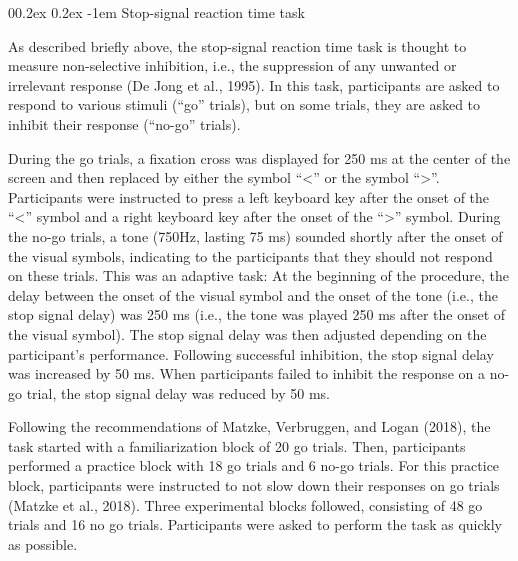 \documentclass[
  man,floatsintext]{apa6}
\makeatletter
\let\oldparagraph\paragraph
\renewcommand{\paragraph}[1]{\oldparagraph{#1}\mbox{}}
\renewcommand{\paragraph}{\@startsection{paragraph}{4}{\parindent}%
  {0\baselineskip \@plus 0.2ex \@minus 0.2ex}%
  {-1em}%
  {\normalfont\normalsize\bfseries\itshape\typesectitle}}
\makeatother
\begin{document}
\hypertarget{stop-signal-reaction-time-task}{%
\paragraph{Stop-signal reaction time task}\label{stop-signal-reaction-time-task}}

As described briefly above, the stop-signal reaction time task is thought to measure non-selective inhibition, i.e., the suppression of any unwanted or irrelevant response (De Jong et al., 1995). In this task, participants are asked to respond to various stimuli (``go'' trials), but on some trials, they are asked to inhibit their response (``no-go'' trials).

During the go trials, a fixation cross was displayed for 250 ms at the center of the screen and then replaced by either the symbol ``\textless{}'' or the symbol ``\textgreater{}''. Participants were instructed to press a left keyboard key after the onset of the ``\textless{}'' symbol and a right keyboard key after the onset of the ``\textgreater{}'' symbol. During the no-go trials, a tone (750Hz, lasting 75 ms) sounded shortly after the onset of the visual symbols, indicating to the participants that they should not respond on these trials. This was an adaptive task: At the beginning of the procedure, the delay between the onset of the visual symbol and the onset of the tone (i.e., the stop signal delay) was 250 ms (i.e., the tone was played 250 ms after the onset of the visual symbol). The stop signal delay was then adjusted depending on the participant's performance. Following successful inhibition, the stop signal delay was increased by 50 ms. When participants failed to inhibit the response on a no-go trial, the stop signal delay was reduced by 50 ms.

Following the recommendations of Matzke, Verbruggen, and Logan (2018), the task started with a familiarization block of 20 go trials. Then, participants performed a practice block with 18 go trials and 6 no-go trials. For this practice block, participants were instructed to not slow down their responses on go trials (Matzke et al., 2018). Three experimental blocks followed, consisting of 48 go trials and 16 no go trials. Participants were asked to perform the task as quickly as possible.
\end{document}
